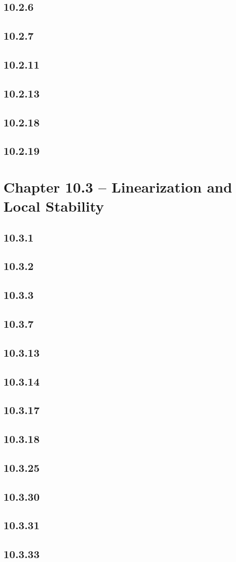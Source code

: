 \documentclass{article}
\begin{document}
\subsection{10.2.6}
\subsection{10.2.7}
\subsection{10.2.11}
\subsection{10.2.13}
\subsection{10.2.18}
\subsection{10.2.19}

\section{Chapter 10.3 -- Linearization and Local Stability}

\subsection{10.3.1}
\subsection{10.3.2}
\subsection{10.3.3}
\subsection{10.3.7}
\subsection{10.3.13}
\subsection{10.3.14}
\subsection{10.3.17}
\subsection{10.3.18}
\subsection{10.3.25}
\subsection{10.3.30}
\subsection{10.3.31}
\subsection{10.3.33}
\end{document}
